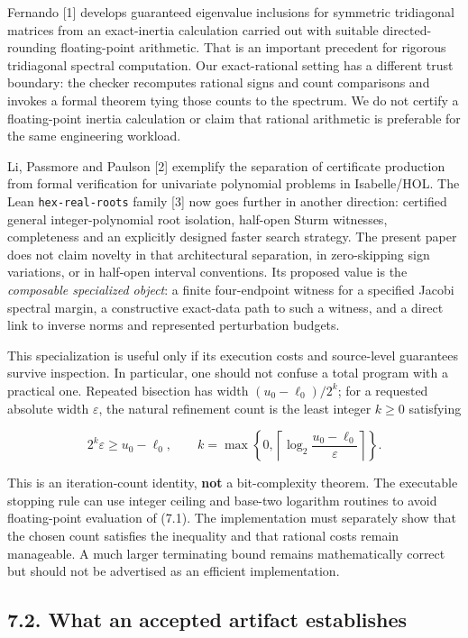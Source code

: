 \documentclass[
  11pt,
]{article}
\begin{document}
Fernando {[}1{]} develops guaranteed eigenvalue inclusions for symmetric
tridiagonal matrices from an exact-inertia calculation carried out with
suitable directed-rounding floating-point arithmetic. That is an
important precedent for rigorous tridiagonal spectral computation. Our
exact-rational setting has a different trust boundary: the checker
recomputes rational signs and count comparisons and invokes a formal
theorem tying those counts to the spectrum. We do not certify a
floating-point inertia calculation or claim that rational arithmetic is
preferable for the same engineering workload.

Li, Passmore and Paulson {[}2{]} exemplify the separation of certificate
production from formal verification for univariate polynomial problems
in Isabelle/HOL. The Lean \texttt{hex-real-roots} family {[}3{]} now
goes further in another direction: certified general integer-polynomial
root isolation, half-open Sturm witnesses, completeness and an
explicitly designed faster search strategy. The present paper does not
claim novelty in that architectural separation, in zero-skipping sign
variations, or in half-open interval conventions. Its proposed value is
the \emph{composable specialized object}: a finite four-endpoint witness
for a specified Jacobi spectral margin, a constructive exact-data path
to such a witness, and a direct link to inverse norms and represented
perturbation budgets.

This specialization is useful only if its execution costs and
source-level guarantees survive inspection. In particular, one should
not confuse a total program with a practical one. Repeated bisection has
width \((u_0-\ell_0)/2^k\); for a requested absolute width
\(\varepsilon\), the natural refinement count is the least integer
\(k\ge0\) satisfying

\[
2^k\varepsilon\ge u_0-\ell_0,
\qquad
k=\max\left\{0,\left\lceil
\log_2\frac{u_0-\ell_0}{\varepsilon}\right\rceil\right\}.
\tag{7.1}
\]

This is an iteration-count identity, \textbf{not} a bit-complexity
theorem. The executable stopping rule can use integer ceiling and
base-two logarithm routines to avoid floating-point evaluation of (7.1).
The implementation must separately show that the chosen count satisfies
the inequality and that rational costs remain manageable. A much larger
terminating bound remains mathematically correct but should not be
advertised as an efficient implementation.

\subsection{7.2. What an accepted artifact
establishes}\label{what-an-accepted-artifact-establishes}
\end{document}
